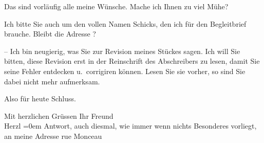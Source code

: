 \pstart
           Das sind vorläufig alle meine Wünsche. Mache ich Ihnen zu viel Mühe?\pend
           
\pstart
           Ich bitte Sie auch um den vollen Namen Schicks,
               den ich für den Begleitbrief brauche. {\pb}Bleibt die Adresse \label{K_L03838-3v}\label{K_L03838-3}?\pend
           
\pstart
           – Ich bin neugierig, was Sie zur Revision meines Stückes sagen. Ich will Sie bitten, diese Revision erst in
               der Reinschrift des Abschreibers zu lesen, damit Sie seine Fehler entdecken
               u. corrigiren können. Lesen Sie sie vorher, so sind Sie dabei nicht mehr
               aufmerksam.\pend
           
\pstart
           Also für heute Schluss.\pend
           
\pstart
           Mit herzlichen Grüssen Ihr Freund{\\[\baselineskip]}\spacefill\mbox{Herzl}\pend
           \leftskip=0em{}
\pstart
           \noindent{}Antwort, auch diesmal, wie immer wenn nichts
                  Besonderes vorliegt, an meine Adresse rue
                     Monceau\pend
           \endnumbering{}
\begin{anhang}
\end{anhang}\newcommand{\dateiname}{L03838}\newcommand{\titel}{Theodor Herzl an Arthur Schnitzler, 11. 12. 1894}\newcommand{\editorInnen}{Selma Jahnke und Martin Anton Müller}
